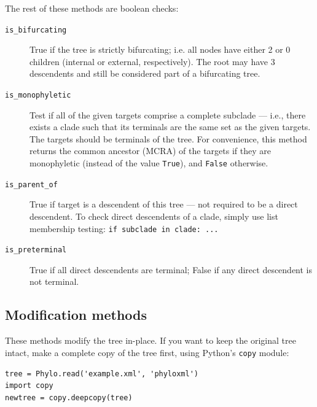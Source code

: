 \documentclass{report}
\begin{document}
The rest of these methods are boolean checks:

\begin{description}
  \item[\texttt{is\_bifurcating}]
    True if the tree is strictly bifurcating; i.e. all nodes have either 2 or 0 children
    (internal or external, respectively). The root may have 3 descendents and still be
    considered part of a bifurcating tree.

  \item[\texttt{is\_monophyletic}]
    Test if all of the given targets comprise a complete subclade --- i.e., there
    exists a clade such that its terminals are the same set as the given targets. The targets
    should be terminals of the tree. For convenience, this method returns the common ancestor
    (MCRA) of the targets if they are monophyletic (instead of the value \verb|True|), and
    \verb|False| otherwise.

  \item[\texttt{is\_parent\_of}] True if target is a descendent of this tree --- not required
    to be a direct descendent. To check direct descendents of a clade, simply use list
    membership testing: \verb|if subclade in clade: ...|

  \item[\texttt{is\_preterminal}] True if all direct descendents are terminal; False if any
    direct descendent is not terminal.

\end{description}


\subsection{Modification methods}

These methods modify the tree in-place. If you want to keep the original tree intact, make a
complete copy of the tree first, using Python's \texttt{copy} module:

\begin{verbatim}
tree = Phylo.read('example.xml', 'phyloxml')
import copy
newtree = copy.deepcopy(tree)
\end{verbatim}
\end{document}
